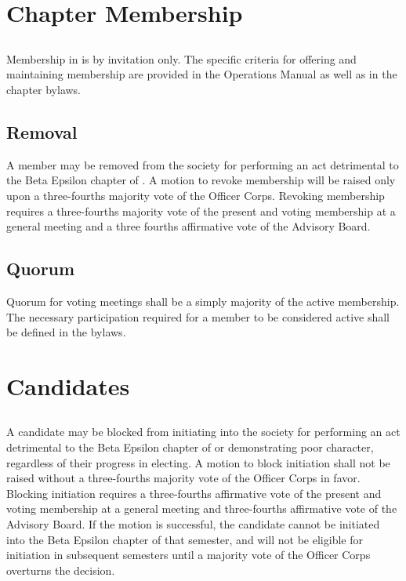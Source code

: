 \chapter{Chapter Membership}\label{sec:membership}


\section{}
Membership in \hkn is by invitation only. The specific criteria for offering and maintaining membership are provided in the \hkn Operations Manual as well as in the chapter bylaws. 

\section{Removal}
A member may be removed from the society for performing an act detrimental to the Beta Epsilon chapter of \hkn. A motion to revoke membership will be raised only upon a three-fourths majority vote of the Officer Corps. Revoking membership requires a three-fourths majority vote of the present and voting membership at a general meeting and a three fourths affirmative vote of the Advisory Board.

\section{Quorum}
 Quorum for voting meetings shall be a simply majority of the active membership. The necessary participation required for a member to be considered active shall be defined in the bylaws.


\chapter{Candidates}\label{sec:candidates}

\section{}
A candidate may be blocked from initiating into the society for performing an act detrimental to the Beta Epsilon chapter of \hkn or demonstrating poor character, regardless of their progress in electing. A motion to block initiation shall not be raised without a three-fourths majority vote of the Officer Corps in favor. Blocking initiation requires a three-fourths affirmative vote of the present and voting membership at a general meeting and three-fourths affirmative vote of the Advisory Board. If the motion is successful, the candidate cannot be initiated into the Beta Epsilon chapter of \hkn that semester, and will not be eligible for initiation  in subsequent semesters until a majority vote of the Officer Corps overturns the decision.

